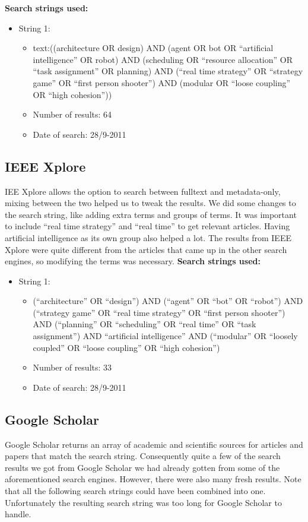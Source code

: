 \textbf{Search strings used:}
\begin{itemize}
\item String 1:
\begin{itemize}
\item text:((architecture OR design) AND (agent OR bot OR ``artificial intelligence'' OR robot) AND (scheduling OR ``resource allocation'' OR ``task assignment'' OR planning) AND (``real time strategy'' OR ``strategy game'' OR ``first person shooter'') AND (modular OR ``loose coupling'' OR ``high cohesion''))
\item Number of results: 64
\item Date of search: 28/9-2011
\end{itemize}
\end{itemize}

\subsection{IEEE Xplore}
\label{sub:ieee_xplore}
IEE Xplore allows the option to search between fulltext and metadata-only, mixing between the two helped us to tweak the results. We did some changes to the search string, like adding extra terms and groups of terms. It was important to include ``real time strategy'' and ``real time'' to get relevant articles. Having artificial intelligence as its own group also helped a lot. The results from IEEE Xplore were quite different from the articles that came up in the other search engines, so modifying the terms was necessary. 
\textbf{Search strings used:}
\begin{itemize}
\item String 1:
\begin{itemize}
\item (``architecture'' OR ``design'') AND (``agent'' OR ``bot'' OR ``robot'') AND (``strategy game'' OR ``real time strategy'' OR ``first person shooter'') AND (``planning'' OR ``scheduling'' OR ``real time'' OR ``task assignment'') AND ``artificial intelligence'' AND (``modular'' OR ``loosely coupled'' OR ``loose coupling'' OR ``high cohesion'')
\item Number of results: 33
\item Date of search: 28/9-2011
\end{itemize}
\end{itemize}

\subsection{Google Scholar}
\label{sub:google_scholar}
Google Scholar returns an array of academic and scientific sources for articles and papers that match the search string. Consequently quite a few of the search results we got from Google Scholar we had already gotten from some of the aforementioned search engines. However, there were also many fresh results. Note that all the following search strings could have been combined into one. Unfortunately the resulting search string was too long for Google Scholar to handle.

